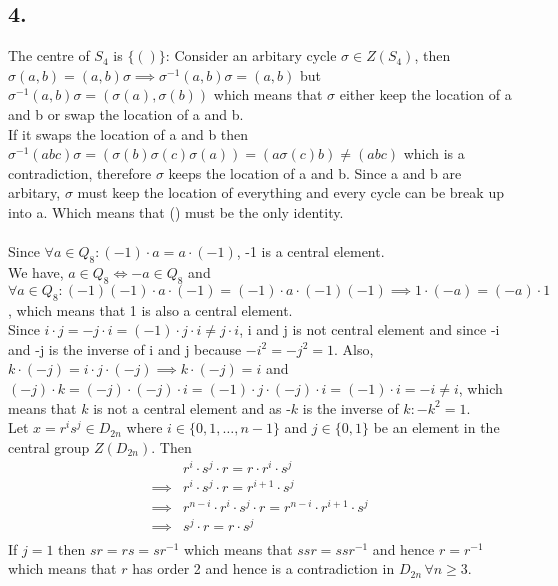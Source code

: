 \documentclass[11pt]{article}
\begin{document}
\subsection*{4.}
The centre of $S_4$ is $\{()\}$:
Consider an arbitary cycle $\sigma \in Z(S_4)$, then $\sigma(a,b) = (a,b) \sigma \implies \sigma^{-1} (a,b) \sigma  = (a,b)$ but $\sigma^{-1}(a,b)\sigma= (\sigma(a), \sigma(b))$ which means that $\sigma$ either keep the location of a and b or swap the location of a and b. \\
If it swaps the location of a and b then $\sigma^{-1} (abc) \sigma = (\sigma(b) \sigma(c) \sigma(a)) = (a\sigma(c)b) \ne (abc)$ which is a contradiction, therefore $\sigma$ keeps the location of a and b. 
Since a and b are arbitary, $\sigma$ must keep the location of everything and every cycle can be break up into a. Which means that () must be the only identity. \\~\\
Since $\forall a \in Q_8: (-1) \cdot a = a \cdot (-1)$, -1 is a central element. \\
We have, $a \in Q_8 \iff -a \in Q_8$ and $\forall a \in Q_8: (-1)(-1) \cdot a \cdot (-1) = (-1) \cdot a \cdot (-1)(-1) \implies 1 \cdot (-a) = (-a) \cdot 1$, which means that 1 is also a central element. \\
 Since $i\cdot j = -j \cdot i = (-1) \cdot j \cdot i \ne j \cdot i$, i and j is not central element and since -i and -j is the inverse of i and j because $-i^2 = -j^2 = 1$.
 Also, $k \cdot (-j) = i\cdot j \cdot (-j) \implies k \cdot (-j) = i$ and $(-j)\cdot k = (-j) \cdot (-j) \cdot i = (-1) \cdot j \cdot (-j) \cdot i = (-1) \cdot i = -i \ne i$, which means that $k$ is not a central element and as -$k$ is the inverse of $k: -k^2 = 1$. \\
Let $x = r^i s^j \in D_{2n}$ where $i \in \{0,1,\ldots,n-1\}$ and $j \in \{0,1\}$ be an element in the central group $Z(D_{2n})$. Then 
\begin{equation*}
\begin{aligned}
&r^i \cdot s^j \cdot r = r \cdot r^i \cdot s^j \\
\implies &r^i \cdot s^j \cdot r = r^{i+1} \cdot s^j \\
\implies &r^{n-i} \cdot r^i \cdot s^j \cdot r = r^{n-i} \cdot r^{i+1} \cdot s^j \\
\implies &s^j \cdot r = r \cdot s^j \\
\end{aligned}
\end{equation*}
If $j = 1$ then $sr = rs = sr^{-1} $ which means that $ssr =ssr^{-1}$ and hence $r = r^{-1}$ which means that $r$ has order 2 and hence is a contradiction in $D_{2n} \, \forall n \ge 3$. \\
\end{document}
